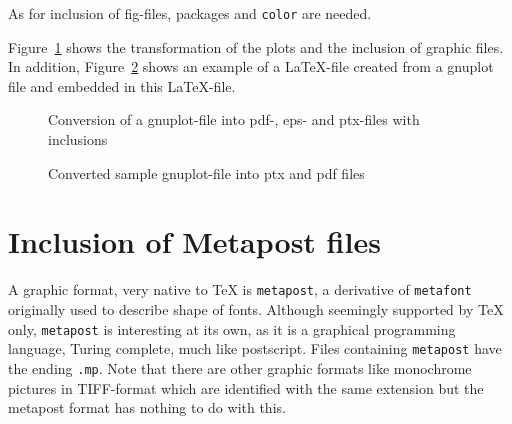 \documentclass[12pt]{book}
\begin{document}
As for inclusion of fig-files, 
packages  and \texttt{color} are needed. 



Figure~\ref{fig:gp2pdf} shows the transformation of the plots 
and the inclusion of graphic files. 
In addition, Figure~\ref{fig:gnuplot} shows an example of a \LaTeX-file 
created from a gnuplot file 
and embedded in this \LaTeX-file. 

\begin{figure}[htb]
\centering
{}
\caption{\label{fig:gp2pdf}Conversion of a gnuplot-file 
into pdf-, eps- and ptx-files with inclusions}
\end{figure}

\begin{figure}[htb]
\centering
{}
\caption{\label{fig:gnuplot}
Converted sample gnuplot-file into ptx and pdf files }
\end{figure}


\section{Inclusion of Metapost files}\label{sec:metapost}

A graphic format, very native to TeX is \texttt{metapost}, 
a derivative of \texttt{metafont} originally used to describe shape of fonts. 
Although seemingly supported by \TeX{} only, 
\texttt{metapost} is interesting at its own, 
as it is a graphical programming language, 
Turing complete, much like postscript. 
Files containing \texttt{metapost} have the ending \texttt{.mp}. 
Note that there are other graphic formats 
like monochrome pictures in TIFF-format 
which are identified with the same extension 
but the metapost format has nothing to do with this. 
\end{document}
